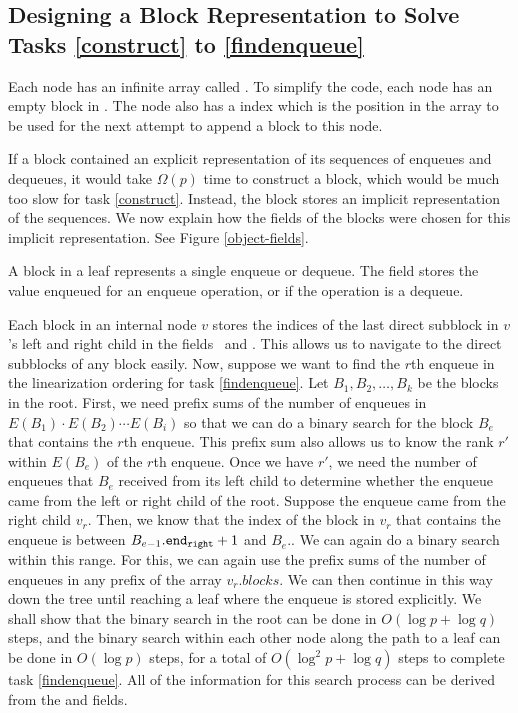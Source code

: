 \subsection{Designing a Block Representation to Solve Tasks \ref{construct} to \ref{findenqueue}}

Each node has an infinite array called .
To simplify the code, each node has an empty block in .
The node also has a  index which is the position in the  array to be used
for the next attempt to append a block to this node.

If a block contained an explicit representation of its sequences of enqueues and dequeues,
it would take $\Omega(p)$ time to construct a block, which would be much too slow for task \ref{construct}.
Instead, the block stores an implicit representation of the sequences.
We now explain how the fields of the blocks were chosen for this implicit representation. 
See Figure \ref{object-fields}.

A block in a leaf represents a single enqueue or dequeue.  The  field stores the value
enqueued for an enqueue operation, or  if the operation is a dequeue.

Each block in an internal node $v$ stores the indices of the last direct subblock in $v$'s left and right child in the fields \eleft\ and \eright.  This allows us to navigate to the direct subblocks of any block easily.
Now, suppose we want to find the $r$th enqueue in the linearization ordering for task \ref{findenqueue}.
Let $B_1, B_2, \ldots, B_k$ be the blocks in the root.
First, we need prefix sums of the number of enqueues in $E(B_1)\cdot E(B_2)\cdots E(B_i)$
so that we can do a binary search for the block $B_e$ that contains the $r$th enqueue.
This prefix sum also allows us to know the rank $r'$ within $E(B_e)$ of the $r$th enqueue.
Once we have $r'$, we need the number of enqueues that $B_e$ received from its left child
to determine whether the enqueue came from the left or right child of the root.
Suppose the enqueue came from the right child $v_r$.
Then, we know that the index of the block in $v_r$ that contains the enqueue
is between $B_{e-1}.{\normalfont{\texttt{end\textsubscript{right}}}} + 1$ and $B_e$.\eright.
We can again do a binary search within this range.
For this, we can again use the prefix sums of the number of enqueues in any prefix of the array $v_r.blocks$.
We can then continue in this way down the tree until reaching a leaf where the enqueue is stored explicitly.
We shall show that the binary search in the root can be done in $O(\log p + \log q)$ steps,
and the binary search within each other node along the path to a leaf can be done in $O(\log p)$ steps,
for a total of $O(\log^2 p + \log q)$ steps to complete task \ref{findenqueue}.
All of the information for this search process can be derived from the 
 and  fields.

